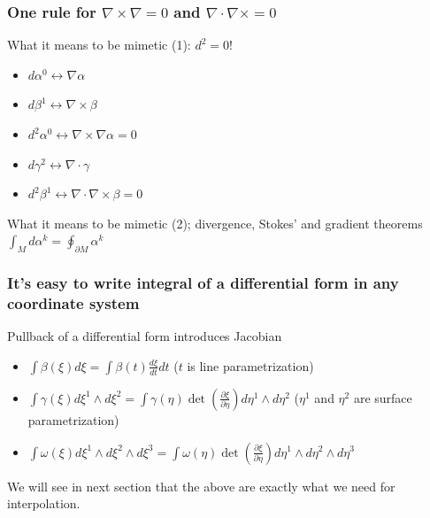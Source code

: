 \documentclass[aspectratio=169]{beamer}
\begin{document}
\begin{frame}[t]
  \frametitle{One rule for $\nabla \times \nabla = 0$ and $\nabla \cdot \nabla \times = 0$}
  \begin{block}{What it means to be mimetic (1): $d^2 = 0$!}
    \begin{itemize}%
    \item $d \alpha^0 \leftrightarrow \nabla \alpha$
    \item $d \beta^1 \leftrightarrow \nabla \times \beta$
    \item $d^2 \alpha^0 \leftrightarrow \nabla \times \nabla \alpha = 0$
    \item $d \gamma^2 \leftrightarrow \nabla \cdot \gamma$
    \item $d^2 \beta^1 \leftrightarrow \nabla \cdot \nabla \times \beta = 0$
    \end{itemize}
  \end{block}
  \begin{block}{What it means to be mimetic (2); divergence, Stokes' and gradient theorems}
   $\int_M d \alpha^k = \oint_{\partial M} \alpha^k$
  \end{block}
\end{frame}

\begin{frame}[t]
  \frametitle{It's easy to write integral of a differential form in any coordinate system}
  \begin{block}{Pullback of a differential form introduces Jacobian}
     \begin{itemize}
       \item $\int \beta(\xi) d\xi = \int \beta(t) \frac{d\xi}{dt} dt$ ($t$ is line parametrization)
       \item $\int \gamma(\xi) d\xi^1 \wedge d\xi^2 = \int \gamma(\eta) \det \left( \frac{\partial\xi}{\partial \eta} \right) d\eta^1 \wedge d\eta^2$ ($\eta^1$ and $\eta^2$ are surface parametrization)
       \item $\int \omega(\xi) d\xi^1 \wedge d\xi^2 \wedge d\xi^3 = \int \omega(\eta) \det \left( \frac{\partial\xi}{\partial \eta} \right) d\eta^1 \wedge d\eta^2 \wedge d\eta^3$
     \end{itemize}
  \end{block}
  \begin{block}{We will see in next section that the above are exactly what we need for interpolation.}
  \end{block}
\end{frame}
\end{document}
